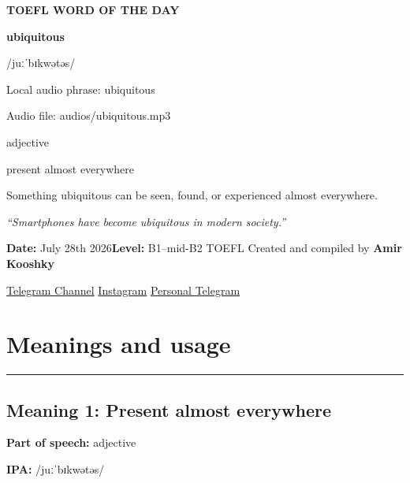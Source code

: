 \documentclass[11pt]{article}
\newcommand{\sectionrule}{\par\vspace{-0.5em}\noindent\textcolor{Accent}{\rule{\linewidth}{0.6pt}}\par}
\begin{document}
\begin{center}
{\sffamily\bfseries\color{Accent} TOEFL WORD OF THE DAY\par}
\vspace{8mm}
{\fontsize{42}{48}\selectfont\bfseries ubiquitous\par}
\vspace{2mm}
{\Large\sffamily\color{Accent} /juːˈbɪkwətəs/\par}
\vspace{2mm}
{\small\sffamily Local audio phrase: ubiquitous\par}
{\small\sffamily Audio file: audios/ubiquitous.mp3\par}
\vspace{2mm}
{\large\sffamily\color{Muted} adjective\par}
\vspace{5mm}
{\sffamily present almost everywhere\par}
\vspace{6mm}
{\large Something ubiquitous can be seen, found, or experienced almost everywhere.\par}
\vspace{6mm}
\begin{minipage}{0.84\textwidth}
\itshape “Smartphones have become ubiquitous in modern society.”
\end{minipage}\par
\vspace{10mm}
\textbf{Date:} July 28th 2026\quad\textbullet\quad \textbf{Level:} B1--mid-B2 TOEFL
\vfill
Created and compiled by \textbf{Amir Kooshky}\par
\vspace{2mm}
\href{https://t.me/KooshkyTOEFL}{Telegram Channel}\quad\textbullet\quad
\href{https://www.instagram.com/kooshkytoefl}{Instagram}\quad\textbullet\quad
\href{https://t.me/KooshkyTOEFL\_pv}{Personal Telegram}
\end{center}
\newpage
\tableofcontents
\newpage

\section{Meanings and usage}
\sectionrule
\subsection{Meaning 1: Present almost everywhere}
\textbf{Part of speech:} adjective

\textbf{IPA:} /juːˈbɪkwətəs/
\end{document}
